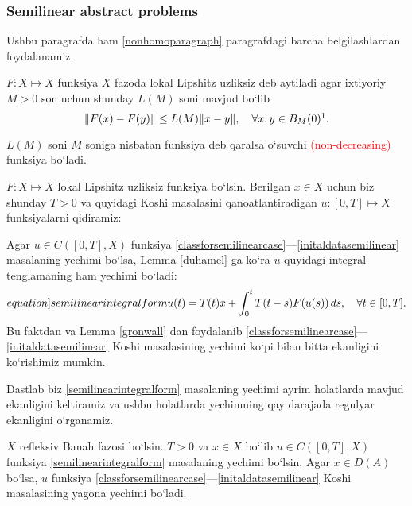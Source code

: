 \subsubsection{Semilinear abstract problems}
Ushbu paragrafda ham \ref{nonhomoparagraph} paragrafdagi barcha belgilashlardan foydalanamiz.
\begin{definition}
    $F\colon X\mapsto X$ funksiya $X$ fazoda lokal Lipshitz uzliksiz deb aytiladi agar ixtiyoriy $M>0$ son uchun shunday $L(M)$ soni mavjud bo`lib 
    \begin{equation*}
        \lVert F(x)-F(y)\rVert\le L(M)\lVert x-y\rVert, \quad \forall x,y\in B_M(0)\footnotemark.
    \end{equation*}
\end{definition}
\vspace{-0.85cm}
\begin{remark}
    $L(M)$ soni $M$ soniga nisbatan funksiya deb qaralsa o`suvchi \textcolor{red}{(non-decreasing)} funksiya bo`ladi.
\end{remark}
 $F\colon X\mapsto X$ lokal Lipshitz uzliksiz funksiya bo`lsin. Berilgan $x\in X$ uchun biz shunday $T>0$ va quyidagi Koshi masalasini qa\-no\-at\-lan\-ti\-ra\-di\-gan $u\colon [0,T]\mapsto X$ funksiyalarni qidiramiz:
 \begin{remark}
    Agar $u\in C\left([0,T], X\right)$ funksiya \eqref{classforsemilinearcase}---\eqref{initaldatasemilinear} masalaning yechimi bo`lsa,  \break Lemma \ref{duhamel} ga ko`ra $u$ quyidagi integral tenglamaning ham yechimi bo`ladi:
    \begin{equation}\label[equation]{semilinearintegralform}
        u(t)=T(t)x+\int_0^t T(t-s)F(u(s))\,ds, \quad \forall t\in[0,T].
    \end{equation}
Bu faktdan va Lemma \ref{gronwall} dan foydalanib \eqref{classforsemilinearcase}---\eqref{initaldatasemilinear} Koshi masalasining yechimi ko`pi bilan bitta ekanligini ko`rishimiz mumkin.
 \end{remark}

 Dastlab biz \eqref{semilinearintegralform} masalaning yechimi ayrim holatlarda mavjud ekanligini keltiramiz va ushbu holatlarda yechimning qay darajada regulyar ekanligini o`rganamiz.

 \begin{theorem}
    $X$ refleksiv Banah fazosi bo`lsin. $T>0$ va $x\in X$ bo`lib $u\in C\left([0,T], X\right)$ funksiya \eqref{semilinearintegralform} masalaning yechimi bo`lsin. Agar $x\in D(A)$ bo`lsa, $u$ funksiya \eqref{classforsemilinearcase}---\eqref{initaldatasemilinear} Koshi masalasining yagona yechimi bo`ladi.
 \end{theorem}